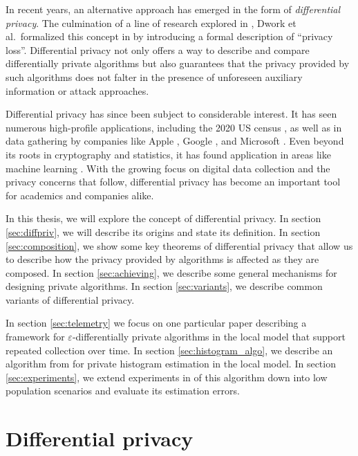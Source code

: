 \documentclass[a4paper,12pt]{article}
\renewcommand{\epsilon}{\varepsilon}
\begin{document}
In recent years, an alternative approach has emerged in the form of \emph{differential privacy}. The culmination of a line of research explored in \cite{precursor_2003,precursor_2004,precusor_2005}, Dwork et al.\ formalized this concept in \cite{dworketal2006} by introducing a formal description of ``privacy loss''. Differential privacy not only offers a way to describe and compare differentially private algorithms but also guarantees that the privacy provided by such algorithms does not falter in the presence of unforeseen auxiliary information or attack approaches.

Differential privacy has since been subject to considerable interest. It has seen numerous high-profile applications, including the 2020 US census \cite{us_census}, as well as in data gathering by companies like Apple \cite{apple_differential,apple_differential_loss}, Google \cite{google_rappor,google_prochlo}, and Microsoft \cite{dworketal2006,microsoft_telemetry}. Even beyond its roots in cryptography and statistics, it has found application in areas like machine learning \cite{ml_abadi,ml_shokri,ml_papernot}. With the growing focus on digital data collection and the privacy concerns that follow, differential privacy has become an important tool for academics and companies alike.

In this thesis, we will explore the concept of differential privacy. In section \ref{sec:diffpriv}, we will describe its origins and state its definition. In section \ref{sec:composition}, we show some key theorems of differential privacy that allow us to describe how the privacy provided by algorithms is affected as they are composed. In section \ref{sec:achieving}, we describe some general mechanisms for designing private algorithms. In section \ref{sec:variants}, we describe common variants of differential privacy.

In section \ref{sec:telemetry} we focus on one particular paper \cite{microsoft_telemetry} describing a framework for $\epsilon$-differentially private algorithms in the local model that support repeated collection over time. In section \ref{sec:histogram_algo}, we describe an algorithm from \cite{microsoft_telemetry} for private histogram estimation in the local model. In section \ref{sec:experiments}, we extend experiments in \cite{microsoft_telemetry} of this algorithm down into low population scenarios and evaluate its estimation errors.

\newpage
\section{Differential privacy \label{sec:diffpriv}}
\end{document}
